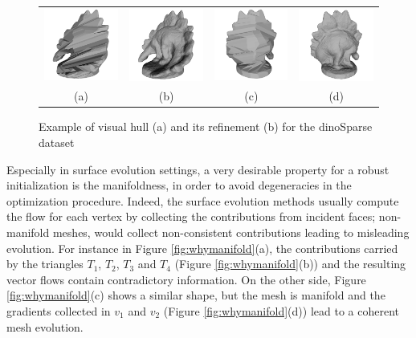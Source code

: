\begin{figure}[t]
\centering
 \begin{tabular}{cccc}
  \includegraphics[width=0.2\columnwidth]{./img/ch_soa/dinoHull01}&
  \includegraphics[width=0.2\columnwidth]{./img/ch_soa/dinoRef01}&
  \includegraphics[width=0.2\columnwidth]{./img/ch_soa/dinoHull02}&
  \includegraphics[width=0.2\columnwidth]{./img/ch_soa/dinoRef02}\\
  (a)&(b)&(c)&(d)
 \end{tabular}
 \caption{Example of visual hull (a) and its refinement (b) for the dinoSparse dataset \cite{seitz_et_al06}}
 \label{fig:visualhullex}
\end{figure}



Especially in surface evolution settings, a very desirable property for a robust initialization is the manifoldness, in order to avoid degeneracies in the optimization procedure. 
Indeed, the surface evolution methods usually compute the flow for each vertex by collecting the contributions from incident faces; non-manifold meshes, would collect non-consistent contributions leading to misleading evolution.
For instance in Figure \ref{fig:whymanifold}(a), the contributions  carried by the triangles $T_1$, $T_2$, $T_3$ and $T_4$ (Figure \ref{fig:whymanifold}(b)) and the resulting vector flows contain contradictory information.
On the other side, Figure \ref{fig:whymanifold}(c) shows a similar shape, but the mesh is manifold and the gradients collected in $v_1$ and $v_2$ (Figure \ref{fig:whymanifold}(d)) lead to a coherent mesh evolution.

